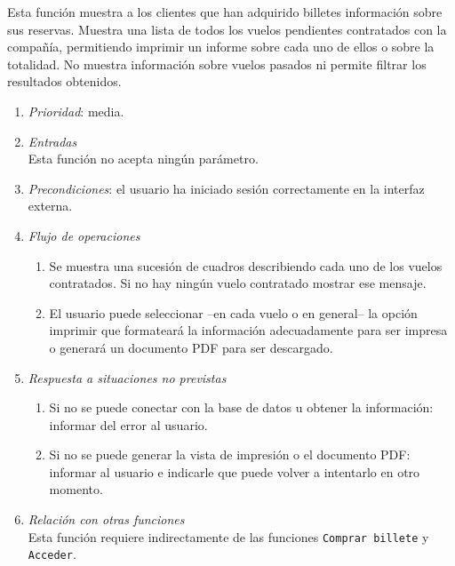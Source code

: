 

	
	Esta función muestra a los clientes que han adquirido billetes información sobre sus reservas. Muestra una lista de todos los vuelos pendientes contratados con la compañía, permitiendo imprimir un informe sobre cada uno de ellos o sobre la totalidad. No muestra información sobre vuelos pasados ni permite filtrar los resultados obtenidos.

	\begin{enumerate}
		\item \textit{Prioridad}: media.
		\item \textit{Entradas}\\
			Esta función no acepta ningún parámetro.

		\item \textit{Precondiciones}: el usuario ha iniciado sesión correctamente en la interfaz externa.
		
		\item \textit{Flujo de operaciones}
			\begin{enumerate}
				\item Se muestra una sucesión de cuadros describiendo cada uno de los vuelos contratados. Si no hay ningún vuelo contratado mostrar ese mensaje.
				\item El usuario puede seleccionar --en cada vuelo o en general-- la opción imprimir que formateará la información adecuadamente para ser impresa o generará un documento \gls{PDF} para ser descargado.
			\end{enumerate}
		\item \textit{Respuesta a situaciones no previstas}
			\begin{enumerate}
				\item Si no se puede conectar con la base de datos u obtener la información: informar del error al usuario.
				\item Si no se puede generar la vista de impresión o el documento \gls{PDF}: informar al usuario e indicarle que puede volver a intentarlo en otro momento.
			\end{enumerate}
		\item \textit{Relación con otras funciones}\\
			Esta función requiere indirectamente de las funciones \verb|Comprar billete| y \verb|Acceder|.
	\end{enumerate}
